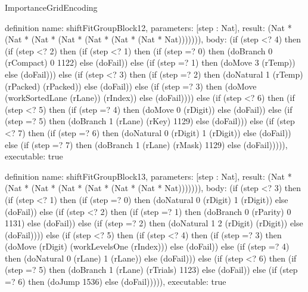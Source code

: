 \begin{lexlean}{ImportanceGridEncoding}
\begin{semanticmodule}
definition{
  name: shiftFitGroupBlock12,
  parameters: [step : Nat],
  result: (Nat * (Nat * (Nat * (Nat * (Nat * (Nat * (Nat * Nat))))))),
  body: (if (step <? 4) then
      (if (step <? 2) then
      (if (step <? 1) then
      (if (step =? 0) then (doBranch 0 (rCompact) 0 1122) else (doFail)) else
      (if (step =? 1) then (doMove 3 (rTemp)) else (doFail))) else
      (if (step <? 3) then
      (if (step =? 2) then (doNatural 1 (rTemp) (rPacked) (rPacked)) else (doFail)) else
      (if (step =? 3) then (doMove (workSortedLane (rLane)) (rIndex)) else (doFail)))) else
      (if (step <? 6) then
      (if (step <? 5) then
      (if (step =? 4) then (doMove 0 (rDigit)) else (doFail)) else
      (if (step =? 5) then (doBranch 1 (rLane) (rKey) 1129) else (doFail))) else
      (if (step <? 7) then
      (if (step =? 6) then (doNatural 0 (rDigit) 1 (rDigit)) else (doFail)) else
      (if (step =? 7) then (doBranch 1 (rLane) (rMask) 1129) else (doFail))))),
  executable: true
}

definition{
  name: shiftFitGroupBlock13,
  parameters: [step : Nat],
  result: (Nat * (Nat * (Nat * (Nat * (Nat * (Nat * (Nat * Nat))))))),
  body: (if (step <? 3) then
      (if (step <? 1) then
      (if (step =? 0) then (doNatural 0 (rDigit) 1 (rDigit)) else (doFail)) else
      (if (step <? 2) then
      (if (step =? 1) then (doBranch 0 (rParity) 0 1131) else (doFail)) else
      (if (step =? 2) then (doNatural 1 2 (rDigit) (rDigit)) else (doFail)))) else
      (if (step <? 5) then
      (if (step <? 4) then
      (if (step =? 3) then (doMove (rDigit) (workLevelsOne (rIndex))) else (doFail)) else
      (if (step =? 4) then (doNatural 0 (rLane) 1 (rLane)) else (doFail))) else
      (if (step <? 6) then
      (if (step =? 5) then (doBranch 1 (rLane) (rTrials) 1123) else (doFail)) else
      (if (step =? 6) then (doJump 1536) else (doFail))))),
  executable: true
}


\end{semanticmodule}
\end{lexlean}
